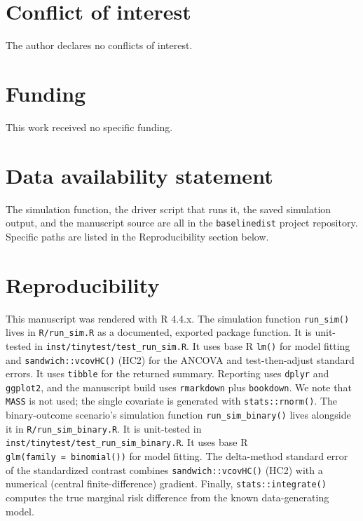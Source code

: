 \documentclass[
  11pt,
]{article}
\begin{document}
\section{Conflict of interest}\label{conflict-of-interest}

The author declares no conflicts of interest.

\section{Funding}\label{funding}

This work received no specific funding.

\section{Data availability statement}\label{data-availability-statement}

The simulation function, the driver script that runs it, the
saved simulation output, and the manuscript source are all in
the \texttt{baselinedist} project repository. Specific paths are
listed in the Reproducibility section below.

\section{Reproducibility}\label{reproducibility}

This manuscript was rendered with R 4.4.x. The simulation
function \texttt{run\_sim()} lives in \texttt{R/run\_sim.R} as a
documented, exported package function. It is
unit-tested in \texttt{inst/tinytest/test\_run\_sim.R}. It uses
base R \texttt{lm()} for model fitting and \texttt{sandwich::vcovHC()}
(HC2) for the ANCOVA and test-then-adjust standard
errors. It uses \texttt{tibble} for the returned summary.
Reporting uses \texttt{dplyr} and \texttt{ggplot2}, and the manuscript
build uses \texttt{rmarkdown} plus \texttt{bookdown}. We note that
\texttt{MASS} is not used; the single covariate is generated
with \texttt{stats::rnorm()}. The binary-outcome scenario's
simulation function \texttt{run\_sim\_binary()} lives alongside
it in \texttt{R/run\_sim\_binary.R}. It is unit-tested in
\texttt{inst/tinytest/test\_run\_sim\_binary.R}. It uses base R
\texttt{glm(family\ =\ binomial())} for model fitting. The
delta-method standard error of the standardized
contrast combines \texttt{sandwich::vcovHC()} (HC2) with a
numerical (central finite-difference) gradient.
Finally, \texttt{stats::integrate()} computes the true
marginal risk difference from the known data-generating
model.
\end{document}
